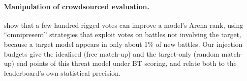 \paragraph{Manipulation of crowdsourced evaluation.}
\citet{min2025improving} show that a few hundred rigged votes can improve a model's Arena rank, using ``omnipresent'' strategies that exploit votes on battles not involving the target, because a target model appears in only about 1\% of new battles.
Our injection budgets give the idealised (free match-up) and the target-only (random match-up) end points of this threat model under BT scoring, and relate both to the leaderboard's own statistical precision.
